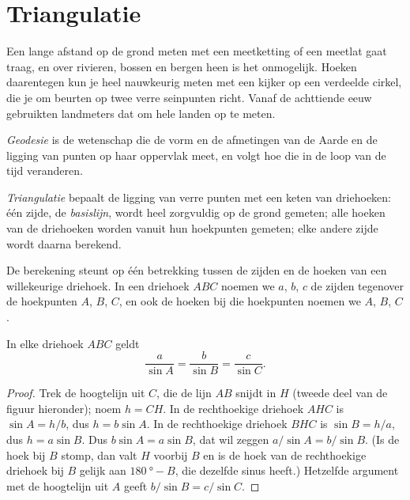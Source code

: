 \section{Triangulatie}

Een lange afstand op de grond meten met een meetketting of een meetlat gaat
traag, en over rivieren, bossen en bergen heen is het onmogelijk. Hoeken
daarentegen kun je heel nauwkeurig meten met een kijker op een verdeelde cirkel,
die je om beurten op twee verre seinpunten richt. Vanaf de achttiende eeuw
gebruikten landmeters dat om hele landen op te meten.

\begin{definition}[Geodesie]\label{def:g10:measuring-the-earth:geodesy}
\emph{Geodesie} is de wetenschap die de vorm en de afmetingen
van de Aarde en de ligging van punten op haar oppervlak meet, en volgt hoe die
in de loop van de tijd veranderen.
\end{definition}

\begin{definition}[Triangulatie]\label{def:g10:measuring-the-earth:triangulation}
\emph{Triangulatie} bepaalt de ligging van verre punten met
een keten van driehoeken: één zijde, de \emph{basislijn}, wordt heel zorgvuldig
op de grond gemeten; alle hoeken van de driehoeken worden vanuit hun hoekpunten
gemeten; elke andere zijde wordt daarna berekend.
\end{definition}

De berekening steunt op één betrekking tussen de zijden en de hoeken van een
willekeurige driehoek. In een driehoek $ABC$ noemen we $a$, $b$, $c$ de zijden
tegenover de hoekpunten $A$, $B$, $C$, en ook de hoeken bij die hoekpunten
noemen we $A$, $B$, $C$.

\begin{proposition}[De sinusregel]\label{prop:g10:measuring-the-earth:sine-rule}
In elke driehoek $ABC$ geldt
\[
  \frac{a}{\sin A} = \frac{b}{\sin B} = \frac{c}{\sin C}.
\]
\end{proposition}

\begin{proof}
Trek de hoogtelijn uit $C$, die de lijn $AB$ snijdt in $H$ (tweede deel van de
figuur hieronder); noem $h = CH$. In de rechthoekige driehoek $AHC$ is
$\sin A = h/b$, dus $h = b \sin A$. In de rechthoekige driehoek $BHC$ is
$\sin B = h/a$, dus $h = a \sin B$. Dus $b \sin A = a \sin B$, dat wil zeggen
$a/\sin A = b/\sin B$. (Is de hoek bij $B$ stomp, dan valt $H$ voorbij $B$ en is
de hoek van de rechthoekige driehoek bij $B$ gelijk aan $\qty{180}{\degree} - B$,
die dezelfde sinus heeft.) Hetzelfde argument met de hoogtelijn uit $A$ geeft
$b/\sin B = c/\sin C$.
\end{proof}

